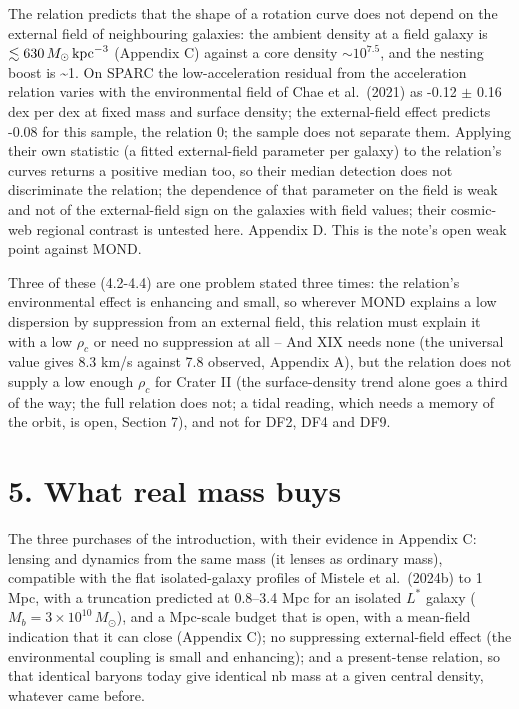 \documentclass[
  10pt,
]{article}
\begin{document}
The relation predicts that the shape of a rotation curve
does not depend on the external field of neighbouring galaxies: the ambient density at a field galaxy is $\lesssim630\,M_\odot\,{\rm kpc}^{-3}$ (Appendix C) against a core density
$\sim 10^{7.5}$, and the nesting boost is \textasciitilde{}1. On SPARC the low-acceleration residual from the
acceleration relation varies with the environmental field of Chae et
al.~(2021) as -0.12 $\pm$ 0.16 dex per dex at fixed mass and surface
density; the external-field effect predicts -0.08 for this sample, the
relation 0; the sample does not separate them. Applying their own statistic
(a fitted external-field parameter per galaxy) to the relation's curves
returns a positive median too, so their median detection does not
discriminate the relation; the dependence of that parameter on the field is
weak and not of the external-field sign on the galaxies with field
values; their cosmic-web regional contrast is untested here. Appendix D.
This is the note's open weak point against MOND.

Three of these (4.2-4.4) are one problem stated three times: the relation's
environmental effect is enhancing and small, so wherever MOND explains a
low dispersion by suppression from an external field, this relation must
explain it with a low $\rho_c$ or need no suppression at all -- And XIX needs none (the universal value gives 8.3 km/s against 7.8 observed, Appendix A), but the relation does not supply a low enough $\rho_c$ for
Crater II (the surface-density trend alone goes a third of the way; the full relation does not; a tidal reading, which needs a memory of the orbit, is open, Section 7), and not for DF2, DF4 and DF9.

\section{5. What real mass buys}\label{what-real-mass-buys}

The three purchases of the introduction, with their evidence in Appendix
C: lensing and dynamics from the same mass (it lenses as ordinary mass),
compatible with the flat isolated-galaxy profiles of Mistele et al.~(2024b) to 1 Mpc, with a truncation predicted at 0.8--3.4 Mpc for an isolated $L^*$ galaxy ($M_b=3\times10^{10}\,M_\odot$), and a Mpc-scale budget that is open, with a mean-field indication that it can close (Appendix C);
no suppressing external-field effect (the environmental coupling is
small and enhancing); and a present-tense relation, so that identical baryons
today give identical nb mass at a given central density, whatever came before.
\end{document}
